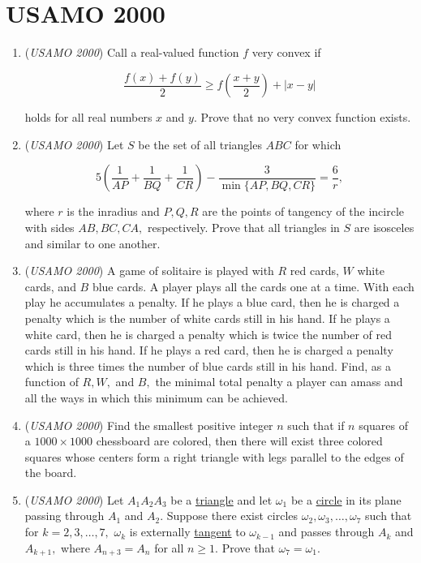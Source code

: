 \section{USAMO 2000}
        \begin{enumerate}
        	\item (\textit{USAMO 2000}) Call a real-valued function $f$ very convex if


 
 \[\frac {f(x) + f(y)}{2} \ge f\left(\frac {x + y}{2}\right) + |x - y|\]


 holds for all real numbers $x$ and $y$. Prove that no very convex function exists.


 

	\item (\textit{USAMO 2000}) Let $S$ be the set of all triangles $ABC$ for which


 
 \[5 \left( \dfrac{1}{AP} + \dfrac{1}{BQ} + \dfrac{1}{CR} \right) - \dfrac{3}{\min\{ AP, BQ, CR \}} = \dfrac{6}{r},\]


 where $r$ is the inradius and $P, Q, R$ are the points of tangency of the incircle with sides $AB, BC, CA,$ respectively. Prove that all triangles in $S$ are isosceles  and similar to one another.


 

	\item (\textit{USAMO 2000}) A game of solitaire is played with $R$ red cards, $W$ white cards, and $B$ blue cards. A player plays all the cards one at a time. With each play he accumulates a penalty. If he plays a blue card, then he is charged a penalty which is the number of white cards still in his hand. If he plays a white card, then he is charged a penalty which is twice the number of red cards still in his hand. If he plays a red card, then he is charged a penalty which is three times the number of blue cards still in his hand. Find, as a function of $R, W,$ and $B,$ the minimal total penalty a player can amass and all the ways in which this minimum can be achieved.


 

	\item (\textit{USAMO 2000}) Find the smallest positive integer $n$ such that if $n$ squares of a $1000\times 1000$ chessboard are colored, then there will exist three colored squares whose centers form a right triangle with legs parallel to the edges of the board.


 

	\item (\textit{USAMO 2000}) Let $A_1A_2A_3$ be a \href{https://artofproblemsolving.com/wiki/index.php?title=Triangle}{triangle} and let $\omega_1$ be a \href{https://artofproblemsolving.com/wiki/index.php?title=Circle}{circle} in its plane passing through $A_1$ and $A_2.$ Suppose there exist circles $\omega_2, \omega_3, \dots, \omega_7$ such that for $k = 2, 3, \dots, 7,$ $\omega_k$ is externally \href{https://artofproblemsolving.com/wiki/index.php?title=Tangent\_(geometry)}{tangent} to $\omega_{k - 1}$ and passes through $A_k$ and $A_{k + 1},$  where $A_{n + 3} = A_{n}$ for all $n \ge 1$. Prove that $\omega_7 = \omega_1.$



\end{enumerate}
